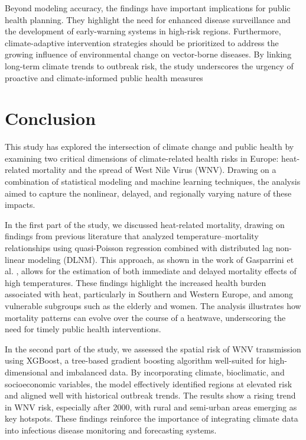 \documentclass[
]{krantz}
\begin{document}
Beyond modeling accuracy, the findings have important implications for public health planning. They highlight the need for enhanced disease surveillance and the development of early-warning systems in high-risk regions. Furthermore, climate-adaptive intervention strategies should be prioritized to address the growing influence of environmental change on vector-borne diseases. By linking long-term climate trends to outbreak risk, the study underscores the urgency of proactive and climate-informed public health measures

\section{Conclusion}\label{conclusion-1}

This study has explored the intersection of climate change and public health by examining two critical dimensions of climate-related health risks in Europe: heat-related mortality and the spread of West Nile Virus (WNV). Drawing on a combination of statistical modeling and machine learning techniques, the analysis aimed to capture the nonlinear, delayed, and regionally varying nature of these impacts.

In the first part of the study, we discussed heat-related mortality, drawing on findings from previous literature that analyzed temperature--mortality relationships using quasi-Poisson regression combined with distributed lag non-linear modeling (DLNM). This approach, as shown in the work of Gasparrini et al. \citep{gasparrini2015}, allows for the estimation of both immediate and delayed mortality effects of high temperatures. These findings highlight the increased health burden associated with heat, particularly in Southern and Western Europe, and among vulnerable subgroups such as the elderly and women. The analysis illustrates how mortality patterns can evolve over the course of a heatwave, underscoring the need for timely public health interventions.

In the second part of the study, we assessed the spatial risk of WNV transmission using XGBoost, a tree-based gradient boosting algorithm well-suited for high-dimensional and imbalanced data. By incorporating climate, bioclimatic, and socioeconomic variables, the model effectively identified regions at elevated risk and aligned well with historical outbreak trends. The results show a rising trend in WNV risk, especially after 2000, with rural and semi-urban areas emerging as key hotspots. These findings reinforce the importance of integrating climate data into infectious disease monitoring and forecasting systems.
\end{document}
